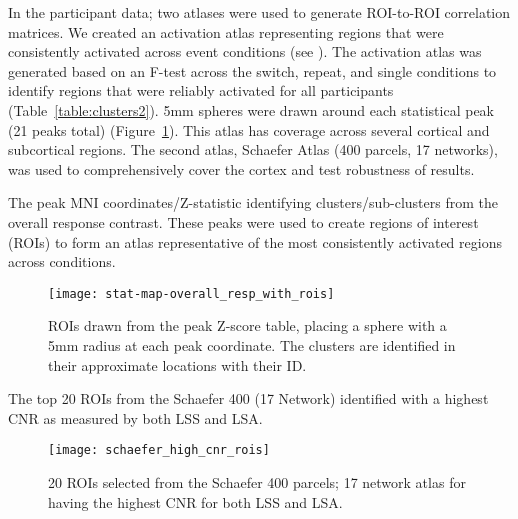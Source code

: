 \documentclass[phd,appendix,figures]{uithesis}
\begin{document}
In the participant data; two atlases were used to generate ROI-to-ROI correlation matrices.
We created an activation atlas representing regions that were
consistently activated across event conditions (see ).
The activation atlas was generated based on an F-test across the switch, repeat, and single conditions
to identify regions that were reliably activated for all participants (Table~\ref{table:clusters2}).
5mm spheres were drawn around each statistical peak (21 peaks total) (Figure~\ref{fig:methroimap2}).
This atlas has coverage across several cortical and subcortical regions.
The second atlas, Schaefer Atlas (400 parcels, 17 networks)\cite{Schaefer2017}, was
used to comprehensively cover the cortex and test robustness of results.


\begin{table}[H]
  \caption{
    The peak MNI coordinates/Z-statistic identifying clusters/sub-clusters from the overall
    response contrast.
    These peaks were used to create regions of interest (ROIs) to form an atlas representative
    of the most consistently activated regions across conditions.
  }
  \label{table:clusters2}
\end{table}

\begin{figure}[H]
  \centering
  \texttt{[image: stat-map-overall\_resp\_with\_rois]}
  \caption[Activation Atlas]{
    ROIs drawn from the peak Z-score table, placing a sphere with a 5mm radius
    at each peak coordinate.
    The clusters are identified in their approximate locations
    with their ID.
  }
  \label{fig:methroimap2}
\end{figure}

\begin{table}[H]
  \caption{
    The top 20 ROIs from the Schaefer 400 (17 Network) identified with a highest CNR as measured by
    both LSS and LSA.
  }
  \label{table:parcels2}
\end{table}

\begin{figure}[H]
  \centering
  \texttt{[image: schaefer\_high\_cnr\_rois]}
  \caption[SchaeferTop20 Atlas]{
    20 ROIs selected from the Schaefer 400 parcels; 17 network atlas for having the
    highest CNR for both LSS and LSA.
  }
  \label{fig:schaefertopmap2}
\end{figure}
\end{document}
